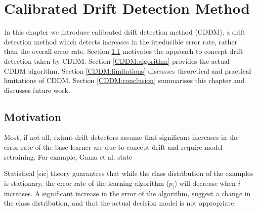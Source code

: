 \chapter{Calibrated Drift Detection Method} \label{chapt:CDDM}

In this chapter we introduce calibrated drift detection method (CDDM), a drift detection method which detects increases in the irreducible error rate, rather than the overall error rate. Section \ref{CDDM:motivation} motivates the approach to concept drift detection taken by CDDM. Section \ref{CDDM:algorithm} provides the actual CDDM algorithm. Section \ref{CDDM:limitations} discusses theoretical and practical limitations of CDDM. Section \ref{CDDM:conclusion} summarises this chapter and discusses future work. 


\section{Motivation} \label{CDDM:motivation}

Most, if not all, extant drift detectors assume that significant increases in the error rate of the base learner are due to concept drift and require model retraining. For example, Gama et al. \cite{DDM} state 
\begin{displayquote}
    Statistical [sic] theory \cite{statistical_theory} guarantees that while the class distribution of the examples is stationary, the error rate of the learning algorithm ($p_i$) will decrease when $i$ increases. A significant increase in the error of the algorithm, suggest a change in the class distribution, and that the actual decision model is not appropriate.
\end{displayquote}


